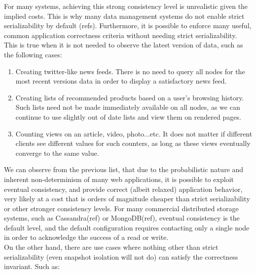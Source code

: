 For many systems, achieving this strong consistency level is unrealistic given
the implied costs. This is why many data management systems do not enable strict
serializability by default (refs). Furthermore, it is possible to enforce many useful, common
application correctness criteria without needing strict serializability. This is
true when it is not needed to observe the latest version of data, such as the
following cases:
\begin{enumerate}
\item Creating twitter-like news feeds. There is no need to query all nodes for
the most recent versions data in order to display a satisfactory news feed.

\item Creating lists of recommended products based on a user's browsing history.
Such lists need not be made immediately available on all nodes, as we can
continue to use slightly out of date lists and view them on rendered pages.

\item Counting views on an article, video, photo...etc. It does not matter if
different clients see different values for such counters, as long as these
views eventually converge to the same value.
\end{enumerate}

We can observe from the previous list, that due to the probabilistic nature and 
inherent non-determinism of many web applications, it is possible to exploit 
eventual consistency, and provide correct (albeit relaxed) application behavior, 
very likely at a cost that is orders of magnitude cheaper than strict serializability 
or other stronger consistency levels. For many commercial distributed storage 
systems, such as Cassandra(ref) or MongoDB(ref), eventual consistency is the default
level, and the default configuration requires contacting only a single node in
order to acknowledge the success of a read or write. \\

On the other hand, there are use cases where nothing other than strict
serializability (even snapshot isolation will not do) can
satisfy the correctness invariant. Such as:

